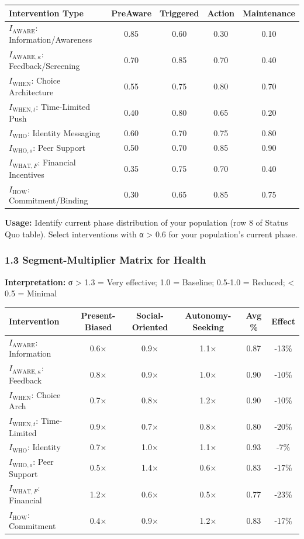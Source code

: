 \begin{center}
\begin{tabular}{@{}lcccc@{}}
\toprule
\textbf{Intervention Type} & \textbf{PreAware} & \textbf{Triggered} & \textbf{Action} & \textbf{Maintenance} \\
\midrule
$I_{\text{AWARE}}$: Information/Awareness & 0.85 & 0.60 & 0.30 & 0.10 \\
$I_{\text{AWARE},\kappa}$: Feedback/Screening & 0.70 & 0.85 & 0.70 & 0.40 \\
$I_{\text{WHEN}}$: Choice Architecture & 0.55 & 0.75 & 0.80 & 0.70 \\
$I_{\text{WHEN},t}$: Time-Limited Push & 0.40 & 0.80 & 0.65 & 0.20 \\
$I_{\text{WHO}}$: Identity Messaging & 0.60 & 0.70 & 0.75 & 0.80 \\
$I_{\text{WHO},o}$: Peer Support & 0.50 & 0.70 & 0.85 & 0.90 \\
$I_{\text{WHAT},F}$: Financial Incentives & 0.35 & 0.75 & 0.70 & 0.40 \\
$I_{\text{HOW}}$: Commitment/Binding & 0.30 & 0.65 & 0.85 & 0.75 \\
\midrule
\end{tabular}
\end{center}

\textbf{Usage:} Identify current phase distribution of your population (row 8 of Status Quo table). Select interventions with α > 0.6 for your population's current phase.

\subsubsection*{1.3 Segment-Multiplier Matrix for Health}

\textbf{Interpretation:} σ > 1.3 = Very effective; 1.0 = Baseline; 0.5-1.0 = Reduced; < 0.5 = Minimal

\begin{center}
\begin{tabular}{@{}lccccc@{}}
\toprule
\textbf{Intervention} & \textbf{Present-Biased} & \textbf{Social-Oriented} & \textbf{Autonomy-Seeking} & \textbf{Avg \%} & \textbf{Effect} \\
\midrule
$I_{\text{AWARE}}$: Information & 0.6× & 0.9× & 1.1× & 0.87 & -13\% \\
$I_{\text{AWARE},\kappa}$: Feedback & 0.8× & 0.9× & 1.0× & 0.90 & -10\% \\
$I_{\text{WHEN}}$: Choice Arch & 0.7× & 0.8× & 1.2× & 0.90 & -10\% \\
$I_{\text{WHEN},t}$: Time-Limited & 0.9× & 0.7× & 0.8× & 0.80 & -20\% \\
$I_{\text{WHO}}$: Identity & 0.7× & 1.0× & 1.1× & 0.93 & -7\% \\
$I_{\text{WHO},o}$: Peer Support & 0.5× & 1.4× & 0.6× & 0.83 & -17\% \\
$I_{\text{WHAT},F}$: Financial & 1.2× & 0.6× & 0.5× & 0.77 & -23\% \\
$I_{\text{HOW}}$: Commitment & 0.4× & 0.9× & 1.2× & 0.83 & -17\% \\
\midrule
\end{tabular}
\end{center}

